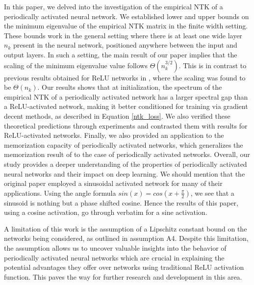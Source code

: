\documentclass{article}
\theoremstyle{plain}
\theoremstyle{definition}
\theoremstyle{remark}
\begin{document}

In this paper, we delved into the investigation of the empirical NTK of a periodically activated neural network. We established lower and upper bounds on the minimum eigenvalue of the empirical NTK matrix in the finite width setting. 
These bounds work in the general setting where there is at least one wide layer $n_k$ present in the neural network, positioned anywhere between the input and output layers. In such a setting, the main result of our paper implies that the scaling of the minimum eigenvalue value follows $\Theta(n_k^{3/2})$. This is in contrast to previous results obtained for ReLU networks in \cite{nguyen2021tight}, where the scaling was found to be $\Theta(n_k)$. 
Our results shows that at initialization, the spectrum of the empirical NTK of a periodically activated network has a larger spectral gap than a ReLU-activated network, making it better conditioned for training via gradient decent methods, as described in Equation \ref{ntk_loss}. 
We also verified these theoretical predictions through experiments and contrasted them with results for ReLU-activated networks. Finally, we also provided an application to the memorization capacity of periodically activated networks, which generalizes the memorization result of \cite{nguyen2021tight} to the case of periodically activated networks. Overall, our study provides a deeper understanding of the properties of periodically activated neural networks and their impact on deep learning. We should mention that the original paper \cite{sitzmann2020implicit} employed a sinusoidal activated network for many of their applications. Using the angle formula $sin(x) = cos(x + \frac{\pi}{2})$, we see that a sinusoid is nothing but a phase shifted cosine. Hence the results of this paper, using a cosine activation, go through verbatim for a sine activation. 

A limitation of this work is the assumption of a Lipschitz constant bound on the networks being considered, as outlined in assumption A4. Despite this limitation, 
the assumption allows us to uncover valuable insights into the behavior of  periodically activated neural networks which are crucial in explaining the potential advantages they offer over networks using traditional ReLU activation function. This paves the way for further research and development in this area.
\end{document}
